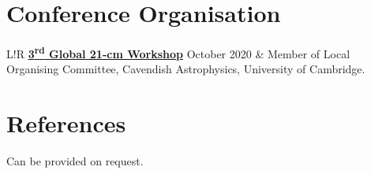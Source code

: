 \documentclass[12pt]{article}
\begin{document}
	\section*{Conference Organisation}
	
	\begin{tabular}{L!{\vrule}R}
		\href{https://sites.google.com/view/third21cmglobalworkshop/home?authuser=0}{\textbf{3\textsuperscript{rd} Global 21-cm Workshop}} October 2020 & Member of Local Organising Committee, Cavendish Astrophysics, University of Cambridge.	
	\end{tabular}
	\section*{References}
	
	Can be provided on request.
\end{document}
